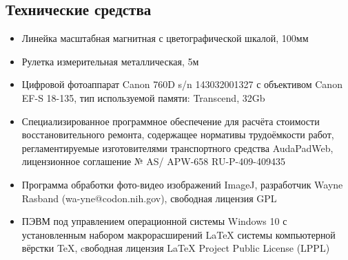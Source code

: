 \subsection{Технические средства}  %
%
\begin{itemize}
%
\item  Линейка масштабная магнитная с цветографической шкалой, 100мм
\item  Рулетка измерительная металлическая, 5м
\item Цифровой фотоаппарат Canon 760D s/n 143032001327 с объективом Canon EF-S 18-135, тип используемой памяти: Transcend,  32Gb
%
\item Специализированное программное обеспечение для расчёта стоимости  восстановительного ремонта, содержащее нормативы трудоёмкости работ, регламентируемые изготовителями транспортного средства     AudaPadWeb, лицензионное соглашение № AS/\- APW-658  RU-P-409-409435
%
\item  Программа обработки фото-видео изображений ImageJ, разработчик  Wayne Rasband (wa-yne@codon.nih.gov),
свободная лицензия GPL
%
\item  ПЭВМ под управлением операционной системы Windows 10 с установленным набором макрорасширений LaTeX системы компьютерной вёрстки TeX, cвободная лицензия LaTeX Project Public License (LPPL)
%	
	\end{itemize}
